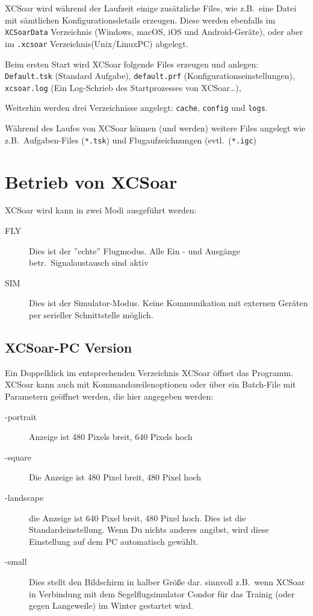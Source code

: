 {\textsf  XCSoar} wird während der Laufzeit einige zusätzliche Files, wie z.B.\ eine Datei mit sämtlichen Konfigurationsdetails erzeugen.
Diese werden ebenfalls im \texttt{XCSoarData} Verzeichnis (Windows, macOS, iOS und Android-Geräte), oder aber im \texttt{.xcsoar} 
Verzeichnis(Unix/LinuxPC) abgelegt. 

Beim ersten Start wird {\textsf  XCSoar}  folgende Files erzeugen und anlegen: 
\texttt{Default.tsk} (Standard Aufgabe),  \texttt{default.prf} (Konfigurationseinstellungen), \texttt{xcsoar.log} 
(Ein Log-Schrieb des Startprozesses von {\textsf  XCSoar}\dots), 



Weiterhin werden drei Verzeichnisse angelegt: \texttt{cache}, \texttt{config} und \texttt{logs}.  

Während des Laufes von {\textsf  XCSoar} können (und werden) weitere Files angelegt wie z.B.\  Aufgaben-Files (\texttt{*.tsk}) 
und Flugaufzeichnungen (evtl.\ (\texttt{*.igc})


\section{Betrieb von {\textsf  XCSoar}}

{\textsf  XCSoar} wird kann in zwei Modi ausgeführt werden:
\begin{description}
\item[FLY] Dies ist der ''echte'' Flugmodus. Alle Ein - und Ausgänge betr.\ Signalaustausch sind aktiv
\item[SIM] Dies ist der Simulator-Modus. Keine Kommunikation mit externen Geräten per serieller Schnittstelle möglich. 
\end{description}

\subsection*{{\textsf  XCSoar}-PC Version}
Ein Doppelklick im entsprechenden Verzeichnis {\textsf  XCSoar} öffnet das Programm. 
{\textsf  XCSoar} kann auch mit Kommandozeilenoptionen oder über ein Batch-File mit Parametern geöffnet werden, 
die hier angegeben werden: 

\begin{description}
\item[-portrait] Anzeige ist 480 Pixels breit, 640 Pixels hoch
\item[-square] Die Anzeige ist 480 Pixel breit, 480 Pixel hoch
\item[-landscape] die Anzeige ist 640 Pixel breit, 480 Pixel hoch. Dies ist die Standardeinstellung.
Wenn Du nichts anderes angibst, wird diese Einstellung auf dem PC automatisch gewählt.
\item[-small] Dies stellt den Bildschirm in halber Größe dar. sinnvoll z.B.\ wenn {\textsf  XCSoar} in Verbindung mit dem Segelflugsimulator 
{\sc Condor} für das Trainig (oder gegen Langeweile) im Winter gestartet wird.
\end{description}

